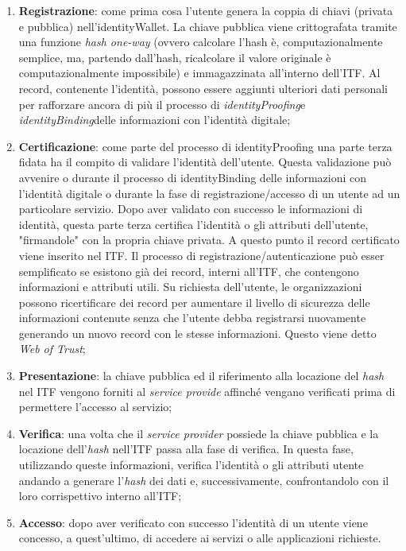 \begin{enumerate}
	\item \textbf{Registrazione}: come prima cosa l'utente genera la coppia di chiavi (privata e pubblica) nell'\gls{identityWallet}. La chiave pubblica viene crittografata tramite una funzione \textit{hash one-way} (ovvero calcolare l'hash è, computazionalmente semplice, ma, partendo dall'hash, ricalcolare il valore originale è computazionalmente impossibile) e immagazzinata all'interno dell'\gls{ITF}. Al record, contenente l'identità, possono essere aggiunti ulteriori dati personali per rafforzare ancora di più il processo di \emph{\gls{identityProofing}}\glsfirstoccur e \emph{\gls{identityBinding}}\glsfirstoccur delle informazioni con l'identità digitale;
	 
	\item \textbf{Certificazione}: come parte del processo di \gls{identityProofing} una parte terza fidata ha il compito di validare l'identità dell'utente. Questa validazione può avvenire o durante il processo di \gls{identityBinding} delle informazioni con l'identità digitale o durante la fase di registrazione/accesso di un utente ad un particolare servizio. Dopo aver validato con successo le informazioni di identità, questa parte terza certifica l'identità o gli attributi dell'utente, "firmandole" con la propria chiave privata. A questo punto il record certificato viene inserito nel \gls{ITF}.
	Il processo di registrazione/autenticazione può esser semplificato se esistono già dei record, interni all'\gls{ITF}, che contengono informazioni e attributi utili. 
	Su richiesta dell'utente, le organizzazioni possono ricertificare dei record per aumentare il livello di sicurezza delle informazioni contenute senza che l'utente debba registrarsi nuovamente generando un nuovo record con le stesse informazioni. Questo viene detto \textit{Web of Trust};
	 
	\item \textbf{Presentazione}: la chiave pubblica ed il riferimento alla locazione del \textit{hash} nel \gls{ITF} vengono forniti al \textit{service provide} affinché vengano verificati prima di permettere l'accesso al servizio;
	
	\item \textbf{Verifica}: una volta che il \textit{service provider} possiede la chiave pubblica e la locazione dell'\textit{hash} nell'\gls{ITF} passa alla fase di verifica.
	In questa fase, utilizzando queste informazioni, verifica l'identità o gli attributi utente andando a generare l'\textit{hash} dei dati e, successivamente, confrontandolo con il loro corrispettivo interno all'\gls{ITF};
	 
	\item \textbf{Accesso}: dopo aver verificato con successo l'identità di un utente viene concesso, a quest'ultimo, di accedere ai servizi o alle applicazioni richieste.
\end{enumerate}



